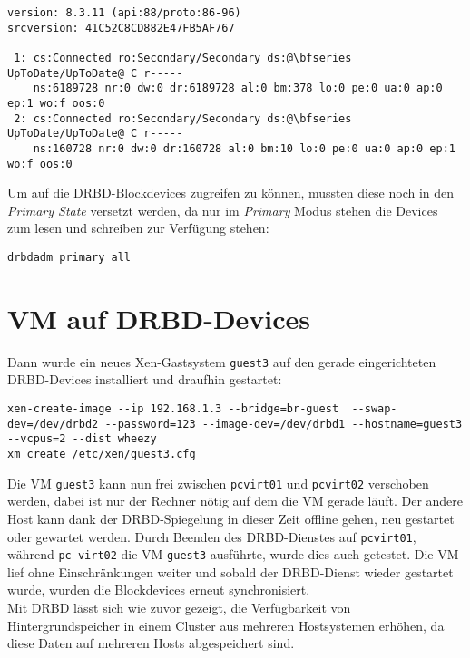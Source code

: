 \setupVerbatimOut
\begin{verbatim}
version: 8.3.11 (api:88/proto:86-96)
srcversion: 41C52C8CD882E47FB5AF767 

 1: cs:Connected ro:Secondary/Secondary ds:@\bfseries UpToDate/UpToDate@ C r-----
    ns:6189728 nr:0 dw:0 dr:6189728 al:0 bm:378 lo:0 pe:0 ua:0 ap:0 ep:1 wo:f oos:0
 2: cs:Connected ro:Secondary/Secondary ds:@\bfseries UpToDate/UpToDate@ C r-----
    ns:160728 nr:0 dw:0 dr:160728 al:0 bm:10 lo:0 pe:0 ua:0 ap:0 ep:1 wo:f oos:0
\end{verbatim}

Um auf die DRBD-Blockdevices zugreifen zu können, mussten diese noch in den \emph{Primary State} versetzt werden, da nur im \emph{Primary} Modus stehen die Devices zum lesen und schreiben zur Verfügung stehen:
\setupVerbatimOut
\begin{verbatim}
drbdadm primary all
\end{verbatim}

\section{VM auf DRBD-Devices}
Dann wurde ein neues Xen-Gastsystem \verb#guest3# auf den gerade eingerichteten DRBD-Devices installiert und draufhin gestartet:
\setupVerbatimOut
\begin{verbatim}
xen-create-image --ip 192.168.1.3 --bridge=br-guest  --swap-dev=/dev/drbd2 --password=123 --image-dev=/dev/drbd1 --hostname=guest3 --vcpus=2 --dist wheezy
xm create /etc/xen/guest3.cfg
\end{verbatim}

Die VM \verb|guest3| kann nun frei zwischen \verb#pcvirt01# und \verb#pcvirt02# verschoben werden, dabei ist nur der Rechner nötig auf dem die VM gerade läuft. Der andere Host kann dank der DRBD-Spiegelung in dieser Zeit offline gehen, neu gestartet oder gewartet werden. Durch Beenden des DRBD-Dienstes auf \verb#pcvirt01#, während \verb#pc-virt02# die VM \verb#guest3# ausführte, wurde dies auch getestet. Die VM lief ohne Einschränkungen weiter und sobald der DRBD-Dienst wieder gestartet wurde, wurden die Blockdevices erneut synchronisiert.
\\
Mit DRBD lässt sich wie zuvor gezeigt, die Verfügbarkeit von Hintergrundspeicher in einem Cluster aus mehreren Hostsystemen erhöhen, da diese Daten auf mehreren Hosts abgespeichert sind.

